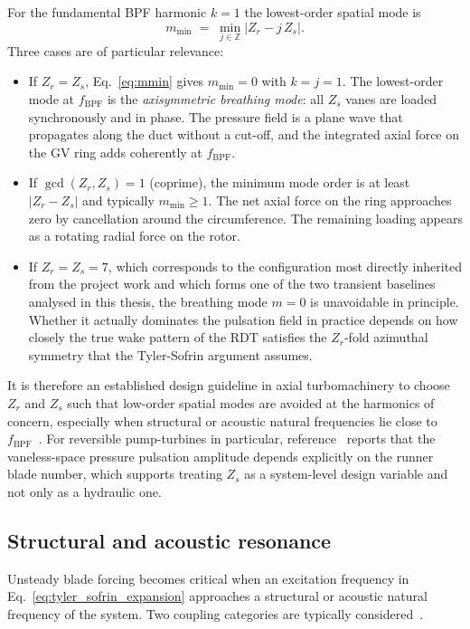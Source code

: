 For the fundamental BPF harmonic $k=1$ the lowest-order spatial mode is
\begin{equation}
    m_{\min} \;=\; \min_{j\in\mathbb{Z}} \bigl| Z_r - j\,Z_s \bigr|.
    \label{eq:mmin}
\end{equation}
Three cases are of particular relevance:
\begin{itemize}
  \item If $Z_r = Z_s$, Eq.~\eqref{eq:mmin} gives $m_{\min}=0$ with $k=j=1$. The lowest-order mode at $f_{\mathrm{BPF}}$ is the \emph{axisymmetric breathing mode}: all $Z_s$ vanes are loaded synchronously and in phase. The pressure field is a plane wave that propagates along the duct without a cut-off, and the integrated axial force on the GV ring adds coherently at $f_{\mathrm{BPF}}$.
  \item If $\gcd(Z_r,Z_s)=1$ (coprime), the minimum mode order is at least $|Z_r - Z_s|$ and typically $m_{\min} \geq 1$. The net axial force on the ring approaches zero by cancellation around the circumference. The remaining loading appears as a rotating radial force on the rotor.
  \item If $Z_r = Z_s = 7$, which corresponds to the configuration most directly inherited from the project work and which forms one of the two transient baselines analysed in this thesis, the breathing mode $m=0$ is unavoidable in principle. Whether it actually dominates the pulsation field in practice depends on how closely the true wake pattern of the RDT satisfies the $Z_r$-fold azimuthal symmetry that the Tyler-Sofrin argument assumes.
\end{itemize}
It is therefore an established design guideline in axial turbomachinery to choose $Z_r$ and $Z_s$ such that low-order spatial modes are avoided at the harmonics of concern, especially when structural or acoustic natural frequencies lie close to $f_{\mathrm{BPF}}$~\cite{Brekke2015,Egusquiza2006,Tanaka2011}. For reversible pump-turbines in particular, reference~\cite{Nduwayezu2021} reports that the vaneless-space pressure pulsation amplitude depends explicitly on the runner blade number, which supports treating $Z_s$ as a system-level design variable and not only as a hydraulic one.
 
\subsection{Structural and acoustic resonance}
\label{sec:rsi-resonance}
 
Unsteady blade forcing becomes critical when an excitation frequency in Eq.~\eqref{eq:tyler_sofrin_expansion} approaches a structural or acoustic natural frequency of the system. Two coupling categories are typically considered~\cite{Egusquiza2006,Tanaka2011}.
 
